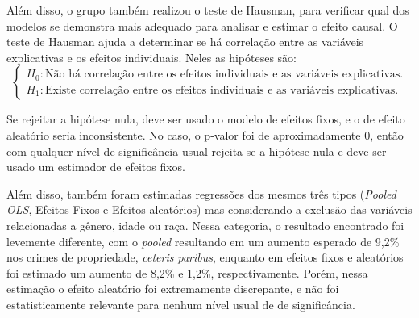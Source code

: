 \documentclass[12pt]{article}
\begin{document}
Além disso, o grupo também realizou o teste de Hausman, para verificar
qual dos modelos se demonstra mais adequado para analisar e estimar o
efeito causal. O teste de Hausman ajuda a determinar se há correlação
entre as variáveis explicativas e os efeitos individuais. Neles as
hipóteses são:
\[
\begin{cases}
H_{0}: \text{Não há correlação entre os efeitos individuais e as variáveis explicativas.} \\
H_{1}: \text{Existe correlação entre os efeitos individuais e as variáveis explicativas.}
\end{cases}
\]

Se rejeitar a hipótese nula, deve ser usado o modelo de efeitos fixos, e o
de efeito aleatório seria inconsistente. No caso, o p-valor foi de
aproximadamente 0, então com qualquer nível de significância usual
rejeita-se a hipótese nula e deve ser usado um estimador de efeitos
fixos.

Além disso, também foram estimadas regressões dos mesmos três tipos
(\emph{Pooled OLS}, Efeitos Fixos e Efeitos aleatórios) mas considerando
a exclusão das variáveis relacionadas a gênero, idade ou raça. Nessa
categoria, o resultado encontrado foi levemente diferente, com o
\emph{pooled} resultando em um aumento esperado de 9,2\% nos crimes de
propriedade, \emph{ceteris paribus}, enquanto em efeitos fixos e
aleatórios foi estimado um aumento de 8,2\% e 1,2\%, respectivamente.
Porém, nessa estimação o efeito aleatório foi extremamente discrepante,
e não foi estatisticamente relevante para nenhum nível usual de de
significância.
\end{document}
